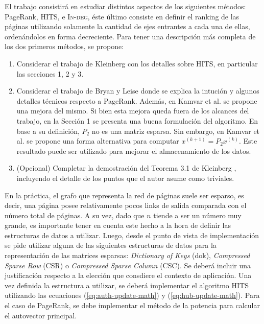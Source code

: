 \documentclass[11pt, a4paper]{article}
\begin{document}
El trabajo consistir\'a en estudiar distintos aspectos de los siguientes m\'etodos: PageRank, HITS, e \textsc{In-deg}, \'este \'ultimo consiste
en definir el ranking de las p\'aginas utilizando solamente la cantidad de ejes entrantes a cada una de ellas, orden\'andolos en forma
decreciente. Para tener una descripci\'on m\'as completa de los dos primeros m\'etodos, se propone:
\begin{enumerate}
\item Considerar el trabajo de Kleinberg \cite{Kleinberg} con los detalles sobre HITS, en particular las secciones 1, 2 y 3.
\item Considerar el trabajo de Bryan y Leise \cite{Bryan2006} donde se explica la intuci\'on y algunos detalles t\'ecnicos respecto a PageRank. Adem\'as, 
en Kamvar et al. \cite{Kamvar2003} se propone una mejora del mismo. Si bien esta mejora queda fuera de los alcances del trabajo, en la Secci\'on 1 se
presenta una buena formulaci\'on del algoritmo. En base a su definici\'on, $P_2$ no es una matriz esparsa. Sin embargo, en Kamvar et al. 
\cite[Algoritmo 1]{Kamvar2003} se propone una forma alternativa para computar $x^{(k+1)} = P_2 x^{(k)}$. Este resultado puede ser utilizado
para mejorar el almacenamiento de los datos.
\item (Opcional) Completar la demostraci\'on del Teorema 3.1 de Kleinberg \cite{Kleinberg}, incluyendo el detalle de los puntos que el autor asume como 
triviales.
\end{enumerate}

En la pr\'actica, el grafo que representa la red de p\'aginas suele ser esparso, es decir, una p\'agina posee relativamente pocos links
de salida comparada con el n\'umero total de p\'aginas. A su vez, dado que $n$ tiende a ser un n\'umero muy grande, es importante tener
en cuenta este hecho a la hora de definir las estructuras de datos a utilizar. Luego, desde el punto de vista de implementaci\'on se pide
utilizar alguna de las siguientes estructuras de datos para la representaci\'on de las matrices esparsas: \emph{Dictionary of Keys} (dok), 
\emph{Compressed Sparse Row} (CSR) o \emph{Compressed Sparse Column} (CSC). Se deber\'a incluir una justificaci\'on respecto a la elecci\'on 
que consdiere el contexto de aplicaci\'on. Una vez definida la estructura a utilizar, se deber\'a implementar el algoritmo HITS utilizando
las ecuaciones (\ref{eq:auth-update-math}) y (\ref{eq:hub-update-math}). Para el caso de PageRank, se debe implementar el m\'etodo de la
potencia para calcular el autovector principal.
\end{document}
